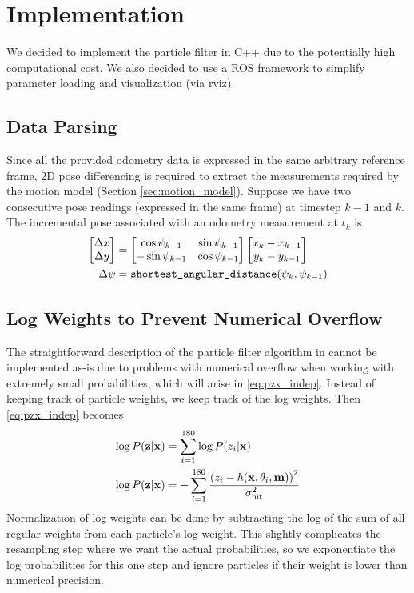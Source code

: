 \section{Implementation}

We decided to implement the particle filter in C++ due to the potentially high computational cost. We also decided to use a ROS framework to simplify parameter loading and visualization (via rviz).

\subsection{Data Parsing}
Since all the provided odometry data is expressed in the same arbitrary reference frame, 2D pose differencing is required to extract the measurements required by the motion model (Section \ref{sec:motion_model}).
Suppose we have two consecutive pose readings (expressed in the same frame) at timestep $k-1$ and $k$.
The incremental pose associated with an odometry measurement at $t_k$ is
\begin{align}
  \begin{bmatrix}  \Delta x \\ \Delta y \end{bmatrix} &= \begin{bmatrix} \cos \psi_{k-1} & \sin \psi_{k-1} \\ -\sin \psi_{k-1} & \cos \psi_{k-1} \end{bmatrix} \begin{bmatrix} x_k - x_{k-1} \\ y_k - y_{k-1} \end{bmatrix} \\
                      \Delta \psi &= \texttt{shortest\_angular\_distance}(\psi_k, \psi_{k-1})
\end{align}


\subsection{Log Weights to Prevent Numerical Overflow}
The straightforward description of the particle filter algorithm in \cite{thrun2005probabilistic} cannot be implemented as-is due to problems with numerical overflow when working with extremely small probabilities, which will arise in \eqref{eq:pzx_indep}.
Instead of keeping track of particle weights, we keep track of the log weights.
Then \eqref{eq:pzx_indep} becomes
\begin{align}
  \log P(\mathbf{z} | \mathbf{x}) &= \sum_{i=1}^{180} \log P(z_i | \mathbf{x}) \\
  \log P(\mathbf{z} | \mathbf{x}) &= - \sum_{i=1}^{180} \frac{\left( z_i - h(\mathbf{x}, \theta_i, \mathbf{m}) \right)^2}{\sigma_{\text{hit}}^2}
\end{align}
Normalization of log weights can be done by subtracting the log of the sum of all regular weights from each particle's log weight. This slightly complicates the resampling step where we want the actual probabilities, so we exponentiate the log probabilities for this one step and ignore particles if their weight is lower than numerical precision.

